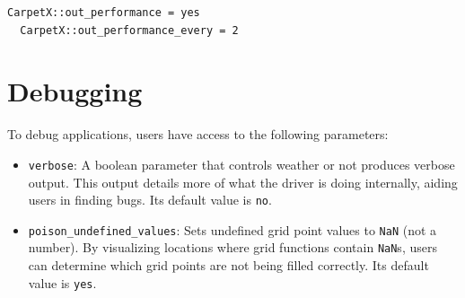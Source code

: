 \begin{lstlisting}[language=bash]
  CarpetX::out_performance = yes  
  CarpetX::out_performance_every = 2
\end{lstlisting}

\section{Debugging}
\label{sec:debugging}

To debug \CarpetX\space applications, users have access to the following parameters: 
%
\begin{itemize}
    \item \texttt{verbose}: A boolean parameter that controls weather or not \CarpetX\space produces verbose output. This output details more of what the driver is doing internally, aiding users in finding bugs. Its default value is \texttt{no}.

    \item \texttt{poison\_undefined\_values}: Sets undefined grid point values to \texttt{NaN} (not a number). By visualizing locations where grid functions contain \texttt{NaN}s, users can determine which grid points are not being filled correctly. Its default value is \texttt{yes}.
\end{itemize}





